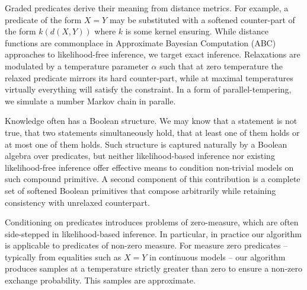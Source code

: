Graded predicates derive their meaning from distance metrics.
For example, a predicate of the form $X = Y$ may be substituted with a softened counter-part of the form $k(d(X, Y))$ where $k$ is some kernel ensuring.
While distance functions are commonplace in Approximate Bayesian Computation (ABC) approaches to likelihood-free inference, we target exact inference.
Relaxations are modulated by a temperature parameter $\alpha$ such that at zero temperature the relaxed predicate mirrors its hard counter-part, while at maximal temperatures virtually everything will satisfy the constraint.
In a form of parallel-tempering, we simulate a number Markov chain in paralle.

Knowledge often has a Boolean structure.
We may know that a statement is not true, that two statements simultaneously hold, that at least one of them holds or at most one of them holds.
Such structure is captured naturally by a Boolean algebra over predicates, but neither likelihood-based inference nor existing likelihood-free inference offer effective means to condition non-trivial models on such compound primitive.
A second component of this contribution is a complete set of softened Boolean primitives that compose arbitrarily while retaining consistency with unrelaxed counterpart.

Conditioning on predicates introduces problems of zero-measure, which are often side-stepped in likelihood-based inference.
In particular, in practice our algorithm is applicable to predicates of non-zero measure.
For measure zero predicates -- typically from equalities such as $X = Y$ in continuous models -- our algorithm produces samples at a temperature strictly greater than zero to ensure a non-zero exchange probability.
This samples are approximate.


